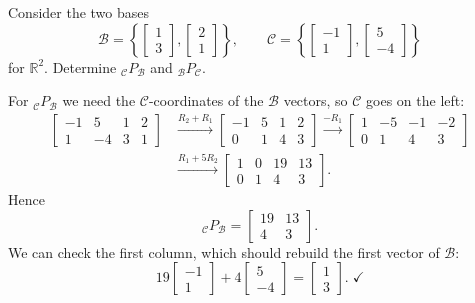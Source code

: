 \begin{example}
Consider the two bases
\[
\mathcal{B} = \left\{ \begin{bmatrix} 1 \\ 3 \end{bmatrix}, \begin{bmatrix} 2 \\ 1 \end{bmatrix} \right\},
\qquad
\mathcal{C} = \left\{ \begin{bmatrix} -1 \\ 1 \end{bmatrix}, \begin{bmatrix} 5 \\ -4 \end{bmatrix} \right\}
\]
for $\mathbb{R}^2$. Determine ${}_{\mathcal{C}}P_{\mathcal{B}}$ and ${}_{\mathcal{B}}P_{\mathcal{C}}$.

\begin{solution}
For ${}_{\mathcal{C}}P_{\mathcal{B}}$ we need the $\mathcal{C}$-coordinates of the $\mathcal{B}$ vectors, so $\mathcal{C}$ goes on the left:
\begin{align*}
\left[\begin{array}{cc|cc}
-1 & 5 & 1 & 2 \\
1 & -4 & 3 & 1
\end{array}\right]
&\xrightarrow{R_2 + R_1}
\left[\begin{array}{cc|cc}
-1 & 5 & 1 & 2 \\
0 & 1 & 4 & 3
\end{array}\right]
\xrightarrow{-R_1}
\left[\begin{array}{cc|cc}
1 & -5 & -1 & -2 \\
0 & 1 & 4 & 3
\end{array}\right] \\[0.8em]
&\xrightarrow{R_1 + 5R_2}
\left[\begin{array}{cc|cc}
1 & 0 & 19 & 13 \\
0 & 1 & 4 & 3
\end{array}\right].
\end{align*}
Hence
\[
{}_{\mathcal{C}}P_{\mathcal{B}} = \begin{bmatrix} 19 & 13 \\ 4 & 3 \end{bmatrix}.
\]
We can check the first column, which should rebuild the first vector of $\mathcal{B}$:
\[
19\begin{bmatrix} -1 \\ 1 \end{bmatrix} + 4\begin{bmatrix} 5 \\ -4 \end{bmatrix} = \begin{bmatrix} 1 \\ 3 \end{bmatrix}. \;\checkmark
\]


\end{solution}
\end{example}
